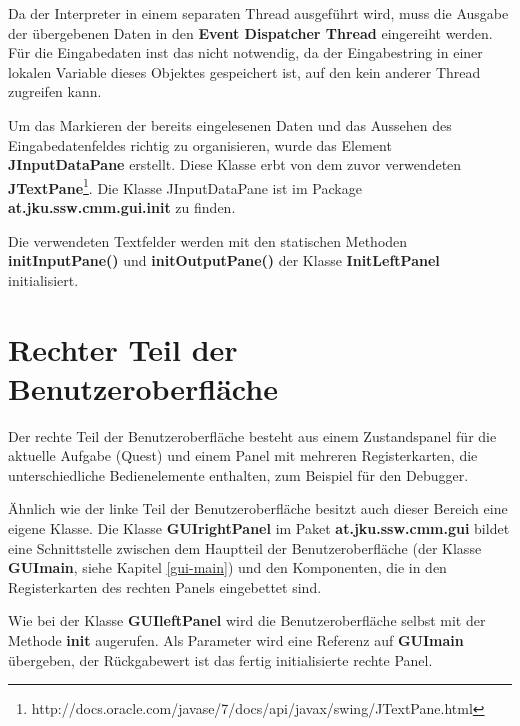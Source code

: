 Da der Interpreter in einem separaten Thread ausgeführt wird, muss die Ausgabe der übergebenen Daten in den \textbf{Event Dispatcher Thread} eingereiht werden. Für die Eingabedaten inst das nicht notwendig, da der Eingabestring in einer lokalen Variable dieses Objektes gespeichert ist, auf den kein anderer Thread zugreifen kann.

Um das Markieren der bereits eingelesenen Daten und das Aussehen des Eingabedatenfeldes richtig zu organisieren, wurde das Element \textbf{JInputDataPane} erstellt. Diese Klasse erbt von dem zuvor verwendeten \textbf{JTextPane}\footnote{http://docs.oracle.com/javase/7/docs/api/javax/swing/JTextPane.html}. Die Klasse JInputDataPane ist im Package \textbf{at.jku.ssw.cmm.gui.init} zu finden. 

Die verwendeten Textfelder werden mit den statischen Methoden \textbf{initInputPane()} und \textbf{initOutputPane()} der Klasse \textbf{InitLeftPanel} initialisiert.

\section{Rechter Teil der Benutzeroberfläche}
Der rechte Teil der Benutzeroberfläche besteht aus einem Zustandspanel für die aktuelle Aufgabe (Quest) und einem Panel mit mehreren Registerkarten, die unterschiedliche Bedienelemente enthalten, zum Beispiel für den Debugger.

Ähnlich wie der linke Teil der Benutzeroberfläche besitzt auch dieser Bereich eine eigene Klasse. Die Klasse \textbf{GUIrightPanel} im Paket \textbf{at.jku.ssw.cmm.gui} bildet eine Schnittstelle zwischen dem Hauptteil der Benutzeroberfläche (der Klasse \textbf{GUImain}, siehe Kapitel \ref{gui-main}) und den Komponenten, die in den Registerkarten des rechten Panels eingebettet sind.

Wie bei der Klasse \textbf{GUIleftPanel} wird die Benutzeroberfläche selbst mit der Methode \textbf{init} augerufen. Als Parameter wird eine Referenz auf \textbf{GUImain} übergeben, der Rückgabewert ist das fertig initialisierte rechte Panel.

